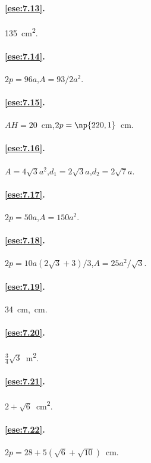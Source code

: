 \paragraph{\ref{ese:7.13}.}
135~cm\textsuperscript{2}.

\paragraph{\ref{ese:7.14}.}
$2p=96a$,\quad $A=93/2a^2$.

\paragraph{\ref{ese:7.15}.}
$AH=20$~cm,\quad $2p=\np{220,1}$~cm.

\paragraph{\ref{ese:7.16}.}
$A=4\sqrt{3}a^2$,\quad $d_1=2\sqrt{3}a$,\quad $d_2=2\sqrt{7}a$.

\paragraph{\ref{ese:7.17}.}
$2p=50a$,\quad $A=150a^2$.

\paragraph{\ref{ese:7.18}.}
$2p=10a(2\sqrt{3}+3)/3$,\quad $A=25a^2/\sqrt{3}$.

\paragraph{\ref{ese:7.19}.}
34~cm,~cm.

\paragraph{\ref{ese:7.20}.}
$\frac{3}{4}\sqrt{3}$~m\textsuperscript{2}.

\paragraph{\ref{ese:7.21}.}
$2+\sqrt{6}$~cm\textsuperscript{2}.

\paragraph{\ref{ese:7.22}.}
$2p=28+5(\sqrt{6}+\sqrt{10})$~cm.

